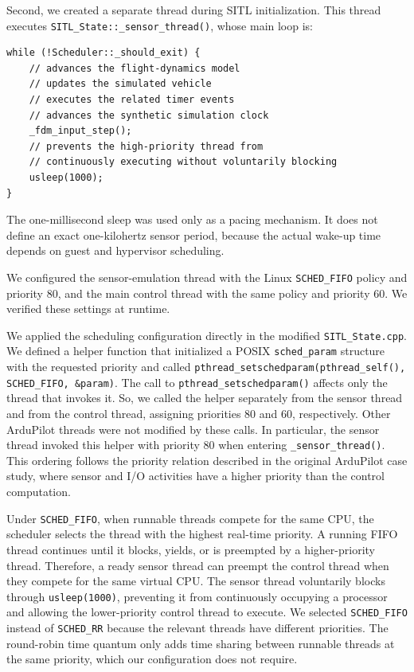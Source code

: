 \noindent Second, we created a separate thread during SITL initialization. This thread executes \texttt{SITL\_State::\_sensor\_thread()}, whose main loop is:
\begin{verbatim}
while (!Scheduler::_should_exit) {
    // advances the flight-dynamics model
    // updates the simulated vehicle
    // executes the related timer events
    // advances the synthetic simulation clock
    _fdm_input_step();
    // prevents the high-priority thread from 
    // continuously executing without voluntarily blocking
    usleep(1000);
}
\end{verbatim}
\noindent The one-millisecond sleep was used only as a pacing mechanism. It does not define an exact one-kilohertz sensor period, because the actual wake-up time depends on guest and hypervisor scheduling.

\noindent We configured the sensor-emulation thread with the Linux \texttt{SCHED\_FIFO} policy and priority 80, and the main control thread with the same policy and priority 60. We verified these settings at runtime.  

\noindent We applied the scheduling configuration directly in the modified \texttt{SITL\_State.cpp}. We defined a helper function that initialized a POSIX \texttt{sched\_param} structure with the requested priority and called \texttt{pthread\_setschedparam(pthread\_self(), SCHED\_FIFO, \&param)}. The call to \texttt{pthread\_setschedparam()} affects only the thread that invokes it. So, we called the helper separately from the sensor thread and from the control thread, assigning priorities 80 and 60, respectively. Other ArduPilot threads were not modified by these calls. In particular, the sensor thread invoked this helper with priority 80 when entering \texttt{\_sensor\_thread()}. This ordering follows the priority relation described in the original ArduPilot case study, where sensor and I/O activities have a higher priority than the control computation.

\noindent Under \texttt{SCHED\_FIFO}, when runnable threads compete for the same CPU, the scheduler selects the thread with the highest real-time priority. A running FIFO thread continues until it blocks, yields, or is preempted by a higher-priority thread. Therefore, a ready sensor thread can preempt the control thread when they compete for the same virtual CPU. The sensor thread voluntarily blocks through \texttt{usleep(1000)}, preventing it from continuously occupying a processor and allowing the lower-priority control thread to execute.
We selected \texttt{SCHED\_FIFO} instead of \texttt{SCHED\_RR} because the relevant threads have different priorities. The round-robin time quantum only adds time sharing between runnable threads at the same priority, which our configuration does not require.

